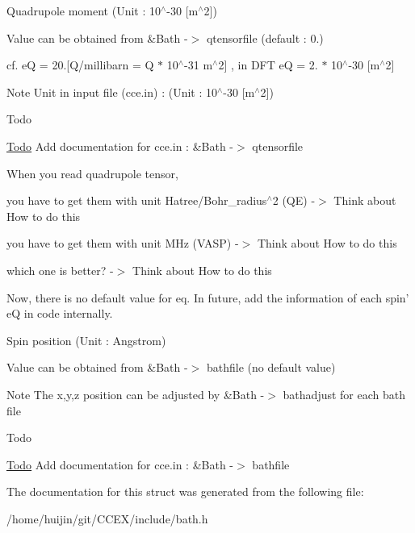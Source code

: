 Quadrupole moment (Unit \-: 10$^\wedge$-\/30 \mbox{[}m$^\wedge$2\mbox{]}) 

Value can be obtained from \&Bath -\/$>$ qtensorfile (default \-: 0.)
\begin{DoxyItemize}
\item cf. e\-Q = 20.\mbox{[}Q/millibarn = Q $\ast$ 10$^\wedge$-\/31 m$^\wedge$2\mbox{]} , in D\-F\-T e\-Q = 2. $\ast$ 10$^\wedge$-\/30 \mbox{[}m$^\wedge$2\mbox{]} \begin{DoxyNote}{Note}
Unit in input file (cce.\-in) \-: (Unit \-: 10$^\wedge$-\/30 \mbox{[}m$^\wedge$2\mbox{]}) 
\end{DoxyNote}
\begin{DoxyRefDesc}{Todo}
\item[\hyperlink{todo__todo000003}{Todo}]Add documentation for cce.\-in \-: \&Bath -\/$>$ qtensorfile 

When you read quadrupole tensor,
\begin{DoxyItemize}
\item you have to get them with unit Hatree/\-Bohr\-\_\-radius$^\wedge$2 (Q\-E) -\/$>$ Think about How to do this
\item you have to get them with unit M\-Hz (V\-A\-S\-P) -\/$>$ Think about How to do this
\item which one is better? -\/$>$ Think about How to do this 
\end{DoxyItemize}

Now, there is no default value for eq. In future, add the information of each spin' e\-Q in code internally. \end{DoxyRefDesc}
Spin position (Unit \-: Angstrom)
\end{DoxyItemize}

Value can be obtained from \&Bath -\/$>$ bathfile (no default value) \begin{DoxyNote}{Note}
The x,y,z position can be adjusted by \&Bath -\/$>$ bathadjust for each bath file 
\end{DoxyNote}
\begin{DoxyRefDesc}{Todo}
\item[\hyperlink{todo__todo000004}{Todo}]Add documentation for cce.\-in \-: \&Bath -\/$>$ bathfile \end{DoxyRefDesc}


The documentation for this struct was generated from the following file\-:\begin{DoxyCompactItemize}
\item 
/home/huijin/git/\-C\-C\-E\-X/include/bath.\-h\end{DoxyCompactItemize}
